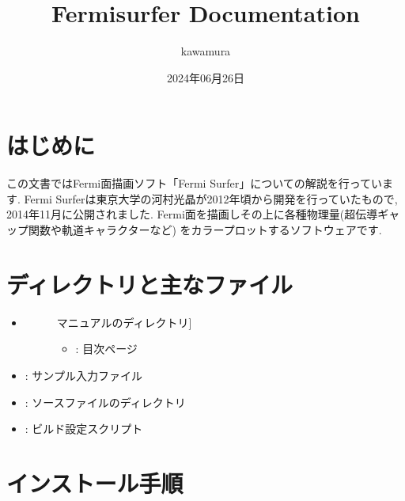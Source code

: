 \documentclass[letterpaper,10pt,dvipdfmx,openany]{sphinxmanual}
\title{Fermisurfer Documentation}
\date{2024年06月26日}
\author{kawamura}
\begin{document}
\pagestyle{empty}
\sphinxmaketitle
\pagestyle{plain}
\sphinxtableofcontents
\pagestyle{normal}
\label{\detokenize{index::doc}}



\chapter{はじめに}
\label{\detokenize{overview:id1}}\label{\detokenize{overview::doc}}
\sphinxAtStartPar
この文書ではFermi面描画ソフト「Fermi Surfer」についての解説を行っています.
Fermi Surferは東京大学の河村光晶が2012年頃から開発を行っていたもので,
2014年11月に公開されました.
Fermi面を描画しその上に各種物理量(超伝導ギャップ関数や軌道キャラクターなど)
をカラープロットするソフトウェアです.


\chapter{ディレクトリと主なファイル}
\label{\detokenize{file:id1}}\label{\detokenize{file::doc}}\begin{itemize}
\item {} \begin{description}
\item[{}] \leavevmode{[}マニュアルのディレクトリ{]}\begin{itemize}
\item {} 
\sphinxAtStartPar
{} : 目次ページ

\end{itemize}

\end{description}

\item {} 
\sphinxAtStartPar
{} : サンプル入力ファイル

\item {} 
\sphinxAtStartPar
{} : ソースファイルのディレクトリ

\item {} 
\sphinxAtStartPar
{} : ビルド設定スクリプト

\end{itemize}


\chapter{インストール手順}
\label{\detokenize{install:id1}}\label{\detokenize{install::doc}}
\end{document}
